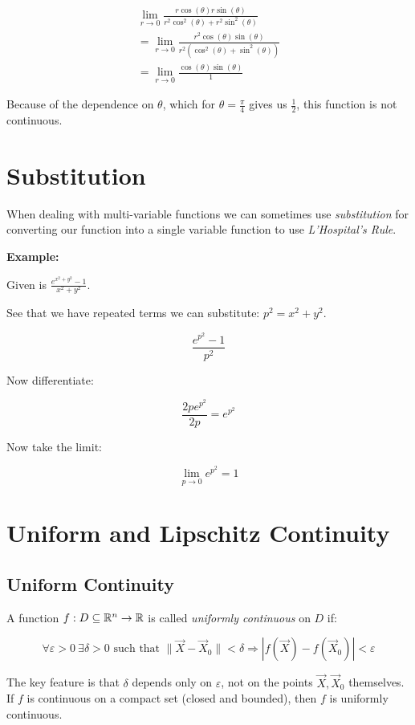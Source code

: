 \begin{align*}
    \lim_{r \to 0} \frac{r\cos(\theta)r\sin(\theta)}{r^2\cos^2(\theta) + r^2\sin^2(\theta)}\\
    = \lim_{r \to 0} \frac{r^2\cos(\theta)\sin(\theta)}{r^2(\cos^2(\theta) + \sin^2(\theta))}\\
    = \lim_{r \to 0} \frac{\cos(\theta)\sin(\theta)}{1}
\end{align*}

Because of the dependence on \(\theta\), which for \(\theta = \frac{\pi}{4}\) gives us \(\frac{1}{2}\), 
this function is not continuous.

\section{Substitution}

When dealing with multi-variable functions we can sometimes use \emph{substitution} 
for converting our function into a single variable function to use \emph{L'Hospital's Rule}.

\textbf{Example:}

Given is \(\frac{e^{x^2 + y^2} - 1}{x^2 + y^2}\).

See that we have repeated terms we can substitute: \(p^2 = x^2 + y^2\).

\[
    \frac{e^{p^2} - 1}{p^2}
\]

Now differentiate:

\[
    \frac{2p e^{p^2} }{2p} = e^{p^2}
\]

Now take the limit:

\[
    \lim_{p \to 0} e^{p^2} = 1
\]

\section{Uniform and Lipschitz Continuity}

\subsection{Uniform Continuity}

A function \( f : D \subseteq \mathbb{R}^n \to \mathbb{R} \) is called \emph{uniformly continuous} on 
\( D \) if:

\[
    \forall \varepsilon > 0 \ \exists \delta > 0 \text{ such that } \|\vec{X} - \vec{X}_0\| < \delta 
    \Rightarrow |f(\vec{X}) - f(\vec{X}_0)| < \varepsilon
\]

The key feature is that \( \delta \) depends only on \( \varepsilon \), not on the points 
\( \vec{X}, \vec{X}_0 \) themselves.  
If \(f\) is continuous on a compact set (closed and bounded), then \(f\) is uniformly continuous.

